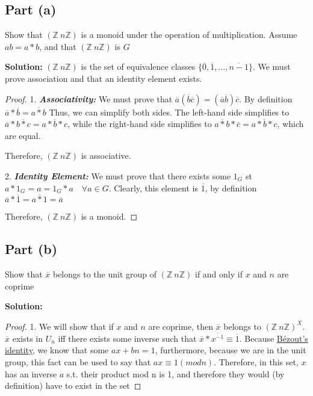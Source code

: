 \documentclass{article}
\begin{document}
\subsection{Part (a)}
Show that $(\mathbb{Z}\ n\mathbb{Z})$ is a monoid under the operation of multiplication. Assume $ab=a*b$, and that $(\mathbb{Z}\ n\mathbb{Z})$ is $G$

\noindent \textbf{Solution:} 
$(\mathbb{Z}\ n\mathbb{Z})$ is the set of equivalence classes $\{\overline{0}, \overline{1}, \ldots, \overline{n-1}\}$. We must prove association and that an identity element exists.

\begin{proof}
1. \textbf{\textit{Associativity:}} We must prove that $\overline{a} (\overline{b} \overline{c}) = (\overline{a} \overline{b}) \overline{c}$. By definition $\overline{a}*\overline{b}=\overline{a*b}$ Thus, we can simplify both sides. The left-hand side simplifies to $\overline{a}*\overline{b*c} = \overline{a*b*c}$, while the right-hand side simplifies to $\overline{a*b}*\overline{c} = \overline{a*b*c}$, which are equal.

Therefore, $(\mathbb{Z}\ n\mathbb{Z})$ is associative.

2. \textbf{\textit{Identity Element:}} We must prove that there exists some $1_G$ st $a*1_G=a=1_G*a \quad \forall a \in G$. Clearly, this element is $\overline{1}$, by definition $\overline{a}*\overline{1}=\overline{a*1}=\overline{a}$

Therefore, $(\mathbb{Z}\ n\mathbb{Z})$ is a monoid.
\end{proof}

\subsection{Part (b)}
Show that $\overline{x}$ belongs to the unit group of $(\mathbb{Z}\ n\mathbb{Z})$ if and only if $x$ and $n$ are coprime

\noindent \textbf{Solution:} 
\begin{proof}
1. We will show that if $x$ and $n$ are coprime, then $\overline{x}$ belongs to $(\mathbb{Z}\ n\mathbb{Z})^X$. $\overline{x}$ exists in $U_n$ iff there exists some inverse such that $\overline{x}*\overline{x^{-1}}\equiv\overline{1}$. Because \href{https://en.wikipedia.org/wiki/B%C3%A9zout%27s_identity}{Bézout's identity}, we know that some $ax+bn=1$, furthermore, because we are in the unit group, this fact can be used to say that $ax\equiv 1 (mod n)$. Therefore, in this set, $x$ has an inverse $a$ s.t. their product mod n is 1, and therefore they would (by definition) have to exist in the set
\end{proof}
\end{document}
